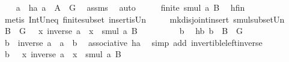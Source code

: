 \begin{isabellebody}
\ \ \isamarkupfalse%
\ a\ \ ha{\isacharcolon}{\kern0pt}\ {\isachardoublequoteopen}a\ {\isasymin}\ A\ {\isasyminter}\ G{\isachardoublequoteclose}\ \isamarkupfalse%
\ assms\ \isamarkupfalse%
\ auto\isanewline
\ \ \isamarkupfalse%
\ \isamarkupfalse%
\ {\isachardoublequoteopen}finite\ {\isacharparenleft}{\kern0pt}smul\ {\isacharbraceleft}{\kern0pt}a{\isacharbraceright}{\kern0pt}\ B{\isacharparenright}{\kern0pt}{\isachardoublequoteclose}\ \isamarkupfalse%
\ hfin\ \isamarkupfalse%
\ {\isacharparenleft}{\kern0pt}metis\ Int{\isacharunderscore}{\kern0pt}Un{\isacharunderscore}{\kern0pt}eq{\isacharparenleft}{\kern0pt}{}{\isacharparenright}{\kern0pt}\ finite{\isacharunderscore}{\kern0pt}subset\ insert{\isacharunderscore}{\kern0pt}is{\isacharunderscore}{\kern0pt}Un\ \isanewline
\ \ \ \ mk{\isacharunderscore}{\kern0pt}disjoint{\isacharunderscore}{\kern0pt}insert\ smul{\isacharunderscore}{\kern0pt}subset{\isacharunderscore}{\kern0pt}Un{\isacharparenleft}{\kern0pt}{}{\isacharparenright}{\kern0pt}{\isacharparenright}{\kern0pt}\isanewline
\ \ \isamarkupfalse%
\ \isamarkupfalse%
\ {\isachardoublequoteopen}B\ {\isasyminter}\ G\ {\isasymsubseteq}\ {\isacharparenleft}{\kern0pt}{\isasymlambda}\ x{\isachardot}{\kern0pt}\ inverse\ a\ {\isasymcdot}\ x{\isacharparenright}{\kern0pt}\ {\isacharbackquote}{\kern0pt}\ smul\ {\isacharbraceleft}{\kern0pt}a{\isacharbraceright}{\kern0pt}\ B{\isachardoublequoteclose}\ \isanewline
\ \ \isamarkupfalse%
\isanewline
\ \ \ \ \isamarkupfalse%
\ b\ \isamarkupfalse%
\ hb{\isacharcolon}{\kern0pt}\ {\isachardoublequoteopen}b\ {\isasymin}\ B\ {\isasyminter}\ G{\isachardoublequoteclose}\isanewline
\ \ \ \ \isamarkupfalse%
\ \isamarkupfalse%
\ {\isachardoublequoteopen}b\ {\isacharequal}{\kern0pt}\ inverse\ a\ {\isasymcdot}\ {\isacharparenleft}{\kern0pt}a\ {\isasymcdot}\ b{\isacharparenright}{\kern0pt}{\isachardoublequoteclose}\ \isamarkupfalse%
\ associative\ ha\ \isamarkupfalse%
\ {\isacharparenleft}{\kern0pt}simp\ add{\isacharcolon}{\kern0pt}\ invertible{\isacharunderscore}{\kern0pt}left{\isacharunderscore}{\kern0pt}inverse{}{\isacharparenright}{\kern0pt}\isanewline
\ \ \ \ \isamarkupfalse%
\ \isamarkupfalse%
\ {\isachardoublequoteopen}b\ {\isasymin}\ {\isacharparenleft}{\kern0pt}{\isasymlambda}\ x{\isachardot}{\kern0pt}\ inverse\ a\ {\isasymcdot}\ x{\isacharparenright}{\kern0pt}\ {\isacharbackquote}{\kern0pt}\ smul\ {\isacharbraceleft}{\kern0pt}a{\isacharbraceright}{\kern0pt}\ B{\isachardoublequoteclose}\ \isamarkupfalse%

\end{isabellebody}

